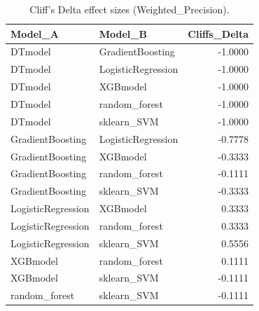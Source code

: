 \begin{table}[t]
\centering
\begin{tabular}{llr}
\toprule
Model_A & Model_B & Cliffs_Delta \\
\midrule
DTmodel & GradientBoosting & -1.0000 \\
DTmodel & LogisticRegression & -1.0000 \\
DTmodel & XGBmodel & -1.0000 \\
DTmodel & random_forest & -1.0000 \\
DTmodel & sklearn_SVM & -1.0000 \\
GradientBoosting & LogisticRegression & -0.7778 \\
GradientBoosting & XGBmodel & -0.3333 \\
GradientBoosting & random_forest & -0.1111 \\
GradientBoosting & sklearn_SVM & -0.3333 \\
LogisticRegression & XGBmodel & 0.3333 \\
LogisticRegression & random_forest & 0.3333 \\
LogisticRegression & sklearn_SVM & 0.5556 \\
XGBmodel & random_forest & 0.1111 \\
XGBmodel & sklearn_SVM & -0.1111 \\
random_forest & sklearn_SVM & -0.1111 \\
\bottomrule
\end{tabular}
\caption{Cliff's Delta effect sizes (Weighted_Precision).}
\label{tab:cliffs_Weighted_Precision}
\end{table}
